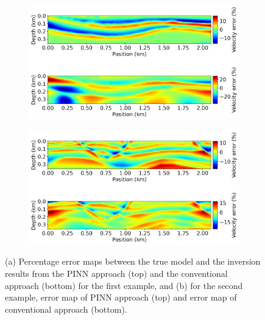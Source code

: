 \begin{figure}
       \centering
       \begin{subfigure}[b]{1.\textwidth}
               \centering
               \includegraphics[width=\textwidth]{figures/chap03_pinn_enabled/example1_error} 
               \caption{}
               \label{fig:example1_error}
       \end{subfigure}
       \begin{subfigure}[b]{1.\textwidth}
               \centering
               \includegraphics[width=\textwidth]{figures/chap03_pinn_enabled/example2_error}
               \caption{}
               \label{fig:example2_error}
       \end{subfigure}
       \caption{(a) Percentage error maps between the true model and the inversion results from the PINN approach (top) and the conventional approach (bottom) for the first example, and (b) for the second example, error map of PINN approach (top) and error map of conventional approach (bottom).}
       \label{fig:error}
\end{figure}